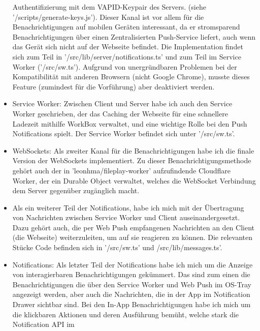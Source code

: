 \documentclass[a4paper]{article}
\begin{document}
\begin{itemize}
            Authentifizierung mit dem VAPID-Keypair des Servers. (siehe
            '/scripts/generate-keys.js'). Dieser Kanal ist vor allem für die
            Benachrichtigungen auf mobilen Geräten interessant, da er
            stromsparend Benachrichtigungen über einen Zentralisierten
            Push-Service liefert, auch wenn das Gerät sich nicht auf der
            Webseite befindet. Die Implementation findet sich zum Teil in
            '/src/lib/server/notifications.ts' und zum Teil im Service Worker
            ('/src/sw.ts'). Aufgrund von unergründbaren Problemen bei der
            Kompatibilität mit anderen Browsern (nicht Google Chrome), musste
            dieses Feature (zumindest für die Vorführung) aber deaktiviert
            werden.
      \item Service Worker: Zwischen Client und Server habe ich auch den Service
            Worker geschrieben, der das Caching der Webseite für eine schnellere
            Ladezeit mithilfe WorkBox verwaltet, und eine wichtige Rolle bei den
            Push Notifications spielt. Der Service Worker befindet sich unter
            '/src/sw.ts'.
      \item WebSockets: Als zweiter Kanal für die Benachrichtigungen habe ich
            die finale Version der WebSockets implementiert. Zu dieser
            Benachrichtigungsmethode gehört auch der in
            'leonhma/fileplay-worker' aufzufindende Cloudflare Worker, der ein
            Durable Object verwaltet, welches die WebSocket Verbindung dem
            Server gegenüber zugänglich macht.
      \item Als ein weiterer Teil der Notifications, habe ich mich mit der
            Übertragung von Nachrichten zwischen Service Worker und Client
            auseinandergesetzt. Dazu gehört auch, die per Web Push empfangenen
            Nachrichten an den Client (die Webseite) weiterzuleiten, um auf sie
            reagieren zu können. Die relevanten Stücke Code befinden sich in
            '/src/sw.ts' und /src/lib/messages.ts'.
      \item Notifications: Als letzter Teil der Notifications habe ich mich um
            die Anzeige von interagierbaren Benachrichtigungen gekümmert. Das
            sind zum einen die Benachrichtigungen die über den Service Worker
            und Web Push im OS-Tray angezeigt werden, aber auch die Nachrichten,
            die in der App im Notification Drawer sichtbar sind. Bei den In-App
            Benachrichtigungen habe ich mich um die klickbaren Aktionen und
            deren Ausführung bemüht, welche stark die Notification API im

\end{itemize}
\end{document}
